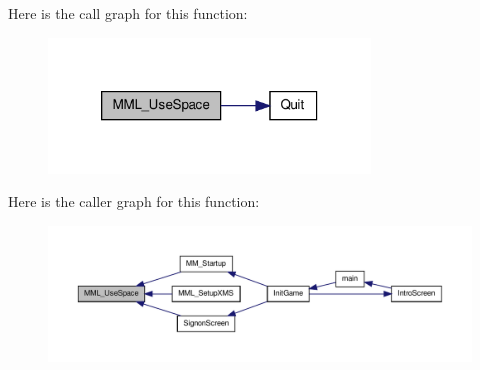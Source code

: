 Here is the call graph for this function:
\nopagebreak
\begin{figure}[H]
\begin{center}
\leavevmode
\includegraphics[width=242pt]{ID__MM_8H_abf7ebac49c519babe994fbe8bb070d04_cgraph}
\end{center}
\end{figure}




Here is the caller graph for this function:
\nopagebreak
\begin{figure}[H]
\begin{center}
\leavevmode
\includegraphics[width=400pt]{ID__MM_8H_abf7ebac49c519babe994fbe8bb070d04_icgraph}
\end{center}
\end{figure}




